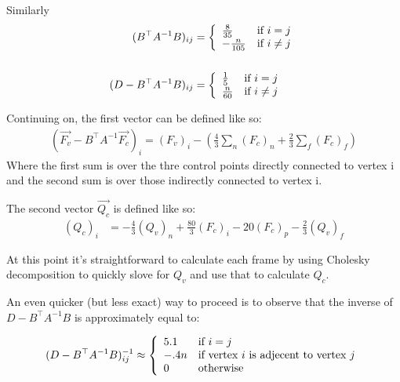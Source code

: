 \documentclass{article}
\begin{document}
Similarly
\begin{align*}
(B^{\top}A^{-1}B)_{ij} &= \left\{ 
  \begin{array}{l l}
    \frac{8}{35} & \text{if $i=j$}\\
    -\frac{n}{105} & \text{if $i\neq j$}\\
  \end{array} \right.  \\
  \\
(D-B^{\top}A^{-1}B)_{ij} &= \left\{ 
  \begin{array}{l l}
    \frac{1}{5} & \text{if $i=j$}\\
    \frac{n}{60} & \text{if $i\neq j$}\\
  \end{array} \right.  \\
\end{align*}

Continuing on, the first vector can be defined like so:
\begin{align*}
\left( \vec{F_v} - B^{\top}A^{-1}\vec{F_c} \right)_i= (F_v)_i - \left( \frac{4}{3} \sum_{n} (F_c)_n + \frac{2}{3} \sum_{f} (F_c)_f \right)
\end{align*}
Where the first sum is over the thre control points directly connected to vertex i and the 
second sum is over those indirectly connected to vertex i. 

The second vector $\vec{Q_c}$ is defined like so:
\begin{align*}
(Q_c)_i &= -\frac{4}{3} (Q_v)_n + \frac{80}{3} (F_{c})_i - 20 (F_c)_{p} - \frac{2}{3} (Q_v)_f  
\end{align*}

At this point it's straightforward to calculate each frame by using Cholesky decomposition 
to quickly slove for $Q_v$ and use that to calculate $Q_c$.

An even quicker (but less exact) way to proceed is to observe that the inverse of 
$D - B^{\top}A^{-1}B$ is approximately equal to:

\begin{align*}
(D-B^{\top}A^{-1}B)^{-1}_{ij} &\approx \left\{ 
  \begin{array}{l l}
    5.1 & \text{if $i=j$}\\
    -.4 n & \text{if vertex $i$ is adjecent to vertex $j$}\\
    0 & \text{otherwise}\\
  \end{array} \right.  \\
\end{align*}
\end{document}

